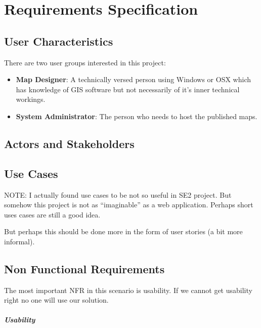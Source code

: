 \chapter{Requirements Specification}
\label{requirements-specification}

\section{User Characteristics}
\label{user-characteristics}

There are two user groups interested in this project:

\begin{itemize}
\item
  \textbf{Map Designer}: A technically versed person using Windows or
  OSX which has knowledge of GIS software but not necessarily of it's
  inner technical workings.
\item
  \textbf{System Administrator}: The person who needs to host the
  published maps.
\end{itemize}

\section{Actors and Stakeholders}
\label{actors-and-stakeholders}

\section{Use Cases}
\label{use-cases}

NOTE: I actually found use cases to be not so useful in SE2 project. But
somehow this project is not as ``imaginable'' as a web application.
Perhaps short uses cases are still a good idea.

But perhaps this should be done more in the form of user stories (a bit
more informal).

\section{Non Functional Requirements}
\label{non-functional-requirements}

The most important NFR in this scenario is usability. If we cannot get
usability right no one will use our solution.

\paragraph{Usability}

